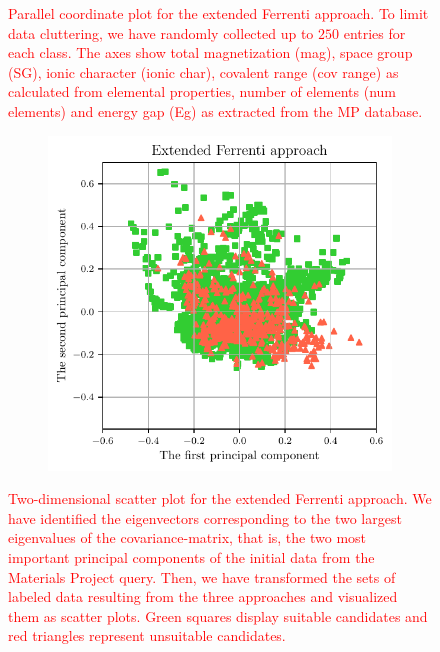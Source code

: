 \documentclass[superscriptaddress,unsortedaddress,
 amsmath,amssymb,
 aps,
]{revtex4-2}
\newcommand{\mrk}[1]{\textcolor{red}{#1}}
\begin{document}
\begin{figure}[t] %
    \centering
    \begin{subfigure}{1\textwidth}
        \centering
          \scalebox{0.85}{}
    \end{subfigure}
    \caption{\mrk{Parallel coordinate plot for the extended Ferrenti approach. To limit data cluttering, we have randomly collected up to $250$ entries for each class. The axes show total magnetization (mag), space group (SG), ionic character (ionic char), covalent range (cov range) as calculated from elemental properties, number of elements (num elements) and energy gap (Eg) as extracted from the MP database.}} 
    \label{fig:parallel-coordinates-approaches}
\end{figure}

\begin{figure}%
    \centering
    \begin{subfigure}{0.4\textwidth}
        \centering
        \includegraphics[width=1\textwidth]{AllFigures/02-augmented-ferrenti-approach.pdf}
    \end{subfigure}
    \caption{\mrk{Two-dimensional scatter plot for the extended Ferrenti approach. We have identified the eigenvectors corresponding to the two largest eigenvalues of the covariance-matrix, that is, the two most important principal components of the initial data from the Materials Project query. Then, we have transformed the sets of labeled data resulting from the three approaches and visualized them as scatter plots. Green squares display suitable candidates and red triangles represent unsuitable candidates.}}
    \label{fig:2dscatterplotpca}
\end{figure}
\end{document}
